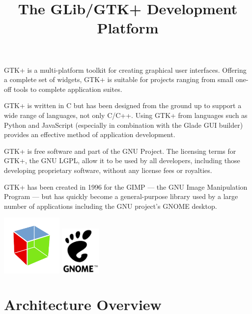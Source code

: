 \documentclass[a4paper,notumble]{leaflet}
\title{The GLib/GTK+ Development Platform}
\date{}
\author{}
\begin{document}
\maketitle
\thispagestyle{empty}

GTK+ is a multi-platform toolkit for creating graphical user interfaces. Offering a complete set of widgets, GTK+ is suitable for projects ranging from small one-off tools to complete application suites.

GTK+ is written in C but has been designed from the ground up to support a wide range of languages, not only C/C++. Using GTK+ from languages such as Python and JavaScript (especially in combination with the Glade GUI builder) provides an effective method of application development.

GTK+ is free software and part of the GNU Project. The licensing terms for GTK+, the GNU LGPL, allow it to be used by all developers, including those developing proprietary software, without any license fees or royalties.

GTK+ has been created in 1996 for the GIMP --- the GNU Image Manipulation Program --- but has quickly become a general-purpose library used by a large number of applications including the GNU project's GNOME desktop.

\begin{center}
  \includegraphics[width=3cm]{images/gtk-logo.pdf}
  \hspace{1cm}
  \includegraphics[width=2cm]{images/gnome-logo.pdf}
\end{center}

\pagebreak

\section{Architecture Overview}
\end{document}
